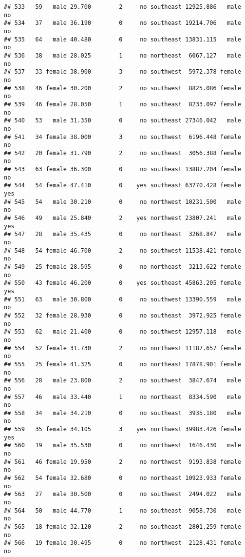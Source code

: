 \documentclass[
]{article}
\begin{document}
\begin{verbatim}
## 533   59   male 29.700        2     no southeast 12925.886   male       no
## 534   37   male 36.190        0     no southeast 19214.706   male       no
## 535   64   male 40.480        0     no southeast 13831.115   male       no
## 536   38   male 28.025        1     no northeast  6067.127   male       no
## 537   33 female 38.900        3     no southwest  5972.378 female       no
## 538   46 female 30.200        2     no southwest  8825.086 female       no
## 539   46 female 28.050        1     no southeast  8233.097 female       no
## 540   53   male 31.350        0     no southeast 27346.042   male       no
## 541   34 female 38.000        3     no southwest  6196.448 female       no
## 542   20 female 31.790        2     no southeast  3056.388 female       no
## 543   63 female 36.300        0     no southeast 13887.204 female       no
## 544   54 female 47.410        0    yes southeast 63770.428 female      yes
## 545   54   male 30.210        0     no northwest 10231.500   male       no
## 546   49   male 25.840        2    yes northwest 23807.241   male      yes
## 547   28   male 35.435        0     no northeast  3268.847   male       no
## 548   54 female 46.700        2     no southwest 11538.421 female       no
## 549   25 female 28.595        0     no northeast  3213.622 female       no
## 550   43 female 46.200        0    yes southeast 45863.205 female      yes
## 551   63   male 30.800        0     no southwest 13390.559   male       no
## 552   32 female 28.930        0     no southeast  3972.925 female       no
## 553   62   male 21.400        0     no southwest 12957.118   male       no
## 554   52 female 31.730        2     no northwest 11187.657 female       no
## 555   25 female 41.325        0     no northeast 17878.901 female       no
## 556   28   male 23.800        2     no southwest  3847.674   male       no
## 557   46   male 33.440        1     no northeast  8334.590   male       no
## 558   34   male 34.210        0     no southeast  3935.180   male       no
## 559   35 female 34.105        3    yes northwest 39983.426 female      yes
## 560   19   male 35.530        0     no northwest  1646.430   male       no
## 561   46 female 19.950        2     no northwest  9193.838 female       no
## 562   54 female 32.680        0     no northeast 10923.933 female       no
## 563   27   male 30.500        0     no southwest  2494.022   male       no
## 564   50   male 44.770        1     no southeast  9058.730   male       no
## 565   18 female 32.120        2     no southeast  2801.259 female       no
## 566   19 female 30.495        0     no northwest  2128.431 female       no

\end{verbatim}
\end{document}
